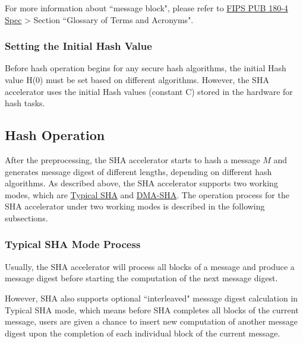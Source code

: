 \documentclass[main\_\_EN.tex]{subfiles}
\begin{document}
\begin{tiplisting}
\vspace{-0.5em}
For more information about ``message block", please refer to \href{https://doi.org/10.6028/NIST.FIPS.180-4}{FIPS PUB 180-4 Spec} > Section ``Glossary of Terms and Acronyms".
\end{tiplisting}

\subsubsection{Setting the Initial Hash Value}\label{sec:sha-initial-hash}

Before hash operation begins for any secure hash algorithms, the initial Hash value H(0) must be set based on different algorithms. However, the SHA accelerator uses the initial Hash values (constant C) stored in the hardware for hash tasks.  

\subsection{Hash Operation}\label{sec:sha-hash-operation}

After the preprocessing, the \chipname{} SHA accelerator starts to hash a message \begin{math}M\end{math} and generates message digest of different lengths, depending on different hash algorithms. As described above, the \chipname{} SHA accelerator supports two working modes, which are \hyperref[sec:sha-typical-sha]{Typical SHA} and \hyperref[sec:sha-dma-sha]{DMA-SHA}. The
operation process for the SHA accelerator under two working modes is described in the following subsections.

\subsubsection{Typical SHA Mode Process}\label{sec:sha-typical-sha}

Usually, the SHA accelerator will process all blocks of a message and produce a message digest before starting the computation of the next message digest.

However, \chipname{} SHA also supports optional ``interleaved" message digest calculation in Typical SHA mode, which means before SHA completes all blocks of the current message, users are given a chance to insert new computation of another message digest upon the completion of each individual block of the current message. 
\end{document}
